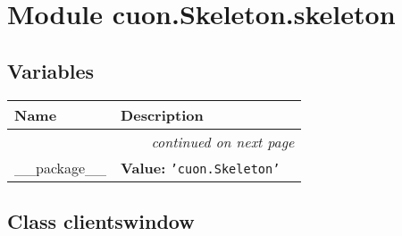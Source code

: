 %
%
%


\section{Module cuon.Skeleton.skeleton}

    \label{cuon:Skeleton:skeleton}


  \subsection{Variables}

    \vspace{-1cm}
\hspace{\varindent}\begin{longtable}{|p{\varnamewidth}|p{\vardescrwidth}|l}
\cline{1-2}
\cline{1-2} \centering \textbf{Name} & \centering \textbf{Description}& \\
\cline{1-2}
\endhead\cline{1-2}\multicolumn{3}{r}{\small\textit{continued on next page}}\\\endfoot\cline{1-2}
\endlastfoot\raggedright \_\-\_\-p\-a\-c\-k\-a\-g\-e\-\_\-\_\- & \raggedright \textbf{Value:} 
{\tt \texttt{'}\texttt{cuon.Skeleton}\texttt{'}}&\\
\cline{1-2}
\end{longtable}



\subsection{Class clientswindow}

